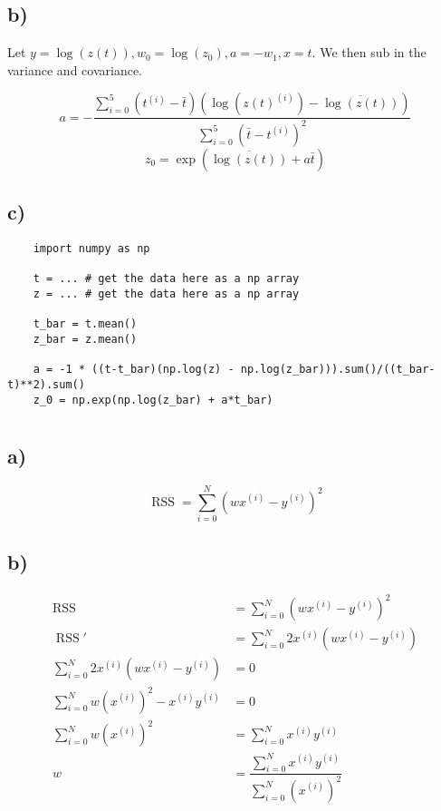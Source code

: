 \documentclass[11pt]{article}
\begin{document}
\subsection{b)}
Let $ y = \log{(z(t))}, w_0 = \log{(z_0)}, a = -w_1, x = t$. We then sub in the variance and covariance.

\[ a = -\dfrac{\sum\limits_{i=0}^{5} \left( t^{(i)} - \bar{t}\right) \left( \log{(z(t)^{(i)})} - \overline{\log{(z(t))}} \right)}{\sum\limits_{i=0}^{5} \left(\bar{t} - t^{(i)}\right)^2}\]
\[ z_0 = \exp{\left(\overline{\log{(z(t))}}+a\bar{t}\right)} \]

\subsection{c)}
\lstset{language=Python}
\begin{lstlisting}
	import numpy as np
	
	t = ... # get the data here as a np array
	z = ... # get the data here as a np array
	
	t_bar = t.mean()
	z_bar = z.mean()
	
	a = -1 * ((t-t_bar)(np.log(z) - np.log(z_bar))).sum()/((t_bar-t)**2).sum()
	z_0 = np.exp(np.log(z_bar) + a*t_bar)
\end{lstlisting}
\newpage

\section{}
\subsection{a)}
\[ \operatorname{RSS} = \sum\limits_{i=0}^{N} \left(wx^{(i)} - y^{(i)}\right)^2\]

\subsection{b)}
\begin{align*}
	\operatorname{RSS} &= \sum\limits_{i=0}^{N} \left(wx^{(i)} - y^{(i)}\right)^2\\
	\operatorname{RSS}' &= \sum\limits_{i=0}^{N} 2x^{(i)}\left(wx^{(i)} - y^{(i)}\right)\\
	\sum\limits_{i=0}^{N} 2x^{(i)}\left(wx^{(i)} - y^{(i)}\right) &= 0 \tag{Set derivative to 0}\\
	\sum\limits_{i=0}^{N} w\left(x^{(i)}\right)^2 - x^{(i)}y^{(i)} &= 0\\
	\sum\limits_{i=0}^{N} w\left(x^{(i)}\right)^2 &= \sum\limits_{i=0}^{N} x^{(i)}y^{(i)}\\
	w &= \dfrac{\sum\limits_{i=0}^{N} x^{(i)}y^{(i)}}{\sum\limits_{i=0}^{N} \left(x^{(i)}\right)^2}
\end{align*}
\end{document}
